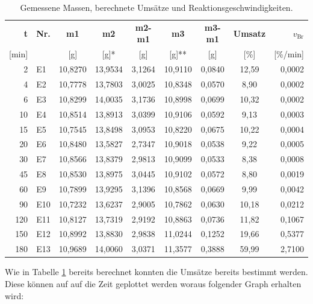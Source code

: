 \documentclass[10pt,a4paper,ngerman]{scrartcl}
\begin{document}
	\begin{table}[h]
    \centering
    \small %
    \setlength{\tabcolsep}{4pt} %
    \caption{Gemessene Massen, berechnete Umsätze und Reaktionsgeschwindigkeiten.}
    \label{Messwerte}
    \begin{tabular}{@{} r l c c c c c c r @{}}
        \toprule
        \textbf{t} & \textbf{Nr.} & \textbf{m1} & \textbf{m2} & \textbf{m2-m1} & \textbf{m3} & \textbf{m3-m1} & \textbf{Umsatz} & \textbf{$v_\text{Br}$} \\ 
        {[min]} & & {[g]} & {[g]*} & {[g]} & {[g]**} & {[g]} & {[\%]} & {[\%/min]} \\ \midrule
        2   & E1  & 10,8270 & 13,9534 & 3,1264 & 10,9110 & 0,0840 & 12,59 & 0,0002 \\
        4   & E2  & 10,7778 & 13,7803 & 3,0025 & 10,8348 & 0,0570 & 8,90  & 0,0002 \\
        6   & E3  & 10,8299 & 14,0035 & 3,1736 & 10,8998 & 0,0699 & 10,32 & 0,0002 \\
        10  & E4  & 10,8514 & 13,8913 & 3,0399 & 10,9106 & 0,0592 & 9,13  & 0,0003 \\
        15  & E5  & 10,7545 & 13,8498 & 3,0953 & 10,8220 & 0,0675 & 10,22 & 0,0004 \\
        20  & E6  & 10,8480 & 13,5827 & 2,7347 & 10,9018 & 0,0538 & 9,22  & 0,0005 \\
        30  & E7  & 10,8566 & 13,8379 & 2,9813 & 10,9099 & 0,0533 & 8,38  & 0,0008 \\
        45  & E8  & 10,8530 & 13,8975 & 3,0445 & 10,9102 & 0,0572 & 8,80  & 0,0019 \\
        60  & E9  & 10,7899 & 13,9295 & 3,1396 & 10,8568 & 0,0669 & 9,99  & 0,0042 \\
        90  & E10 & 10,7232 & 13,6237 & 2,9005 & 10,7862 & 0,0630 & 10,18 & 0,0212 \\
        120 & E11 & 10,8127 & 13,7319 & 2,9192 & 10,8863 & 0,0736 & 11,82 & 0,1067 \\
        150 & E12 & 10,8992 & 13,8830 & 2,9838 & 11,0244 & 0,1252 & 19,66 & 0,5377 \\
        180 & E13 & 10,9689 & 14,0060 & 3,0371 & 11,3577 & 0,3888 & 59,99 & 2,7100 \\ 
        \bottomrule
    \end{tabular}
\end{table}

	Wie in Tabelle \ref{Messwerte} bereits berechnet konnten die Umsätze bereits bestimmt werden.
	Diese können auf auf die Zeit geplottet werden woraus folgender Graph erhalten wird:
\end{document}
